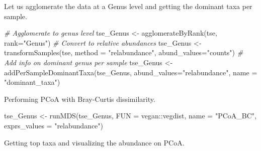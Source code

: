 \documentclass[
]{book}
\newenvironment{Shaded}{\begin{snugshade}}{\end{snugshade}}
\newcommand{\AttributeTok}[1]{\textcolor[rgb]{0.77,0.63,0.00}{#1}}
\newcommand{\CommentTok}[1]{\textcolor[rgb]{0.56,0.35,0.01}{\textit{#1}}}
\newcommand{\FunctionTok}[1]{\textcolor[rgb]{0.00,0.00,0.00}{#1}}
\newcommand{\NormalTok}[1]{#1}
\newcommand{\OtherTok}[1]{\textcolor[rgb]{0.56,0.35,0.01}{#1}}
\newcommand{\SpecialCharTok}[1]{\textcolor[rgb]{0.00,0.00,0.00}{#1}}
\newcommand{\StringTok}[1]{\textcolor[rgb]{0.31,0.60,0.02}{#1}}
\begin{document}
Let us agglomerate the data at a Genus level and getting the dominant taxa per sample.

\begin{Shaded}
\begin{Highlighting}[]
\CommentTok{\# Agglomerate to genus level}
\NormalTok{tse\_Genus }\OtherTok{\textless{}{-}} \FunctionTok{agglomerateByRank}\NormalTok{(tse, }\AttributeTok{rank=}\StringTok{"Genus"}\NormalTok{)}
\CommentTok{\# Convert to relative abundances}
\NormalTok{tse\_Genus }\OtherTok{\textless{}{-}} \FunctionTok{transformSamples}\NormalTok{(tse, }\AttributeTok{method =} \StringTok{"relabundance"}\NormalTok{, }\AttributeTok{abund\_values=}\StringTok{"counts"}\NormalTok{)}
\CommentTok{\# Add info on dominant genus per sample}
\NormalTok{tse\_Genus }\OtherTok{\textless{}{-}} \FunctionTok{addPerSampleDominantTaxa}\NormalTok{(tse\_Genus, }\AttributeTok{abund\_values=}\StringTok{"relabundance"}\NormalTok{, }\AttributeTok{name =} \StringTok{"dominant\_taxa"}\NormalTok{)}
\end{Highlighting}
\end{Shaded}

Performing PCoA with Bray-Curtis dissimilarity.

\begin{Shaded}
\begin{Highlighting}[]
\NormalTok{tse\_Genus }\OtherTok{\textless{}{-}} \FunctionTok{runMDS}\NormalTok{(tse\_Genus, }\AttributeTok{FUN =}\NormalTok{ vegan}\SpecialCharTok{::}\NormalTok{vegdist,}
              \AttributeTok{name =} \StringTok{"PCoA\_BC"}\NormalTok{, }\AttributeTok{exprs\_values =} \StringTok{"relabundance"}\NormalTok{)}
\end{Highlighting}
\end{Shaded}

Getting top taxa and visualizing the abundance on PCoA.
\end{document}
